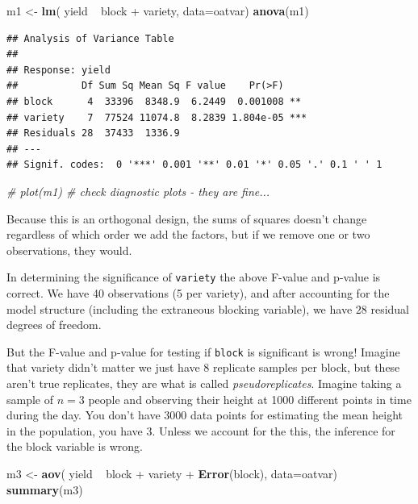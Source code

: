 \documentclass[]{book}
\newenvironment{Shaded}{\begin{snugshade}}{\end{snugshade}}
\newcommand{\KeywordTok}[1]{\textcolor[rgb]{0.13,0.29,0.53}{\textbf{{#1}}}}
\newcommand{\DataTypeTok}[1]{\textcolor[rgb]{0.13,0.29,0.53}{{#1}}}
\newcommand{\StringTok}[1]{\textcolor[rgb]{0.31,0.60,0.02}{{#1}}}
\newcommand{\CommentTok}[1]{\textcolor[rgb]{0.56,0.35,0.01}{\textit{{#1}}}}
\newcommand{\NormalTok}[1]{{#1}}
\theoremstyle{definition}
\theoremstyle{definition}
\theoremstyle{remark}
\begin{document}
\begin{Shaded}
\begin{Highlighting}[]
\NormalTok{m1 <-}\StringTok{ }\KeywordTok{lm}\NormalTok{( yield ~}\StringTok{ }\NormalTok{block +}\StringTok{ }\NormalTok{variety, }\DataTypeTok{data=}\NormalTok{oatvar)}
\KeywordTok{anova}\NormalTok{(m1)}
\end{Highlighting}
\end{Shaded}

\begin{verbatim}
## Analysis of Variance Table
## 
## Response: yield
##           Df Sum Sq Mean Sq F value    Pr(>F)    
## block      4  33396  8348.9  6.2449  0.001008 ** 
## variety    7  77524 11074.8  8.2839 1.804e-05 ***
## Residuals 28  37433  1336.9                      
## ---
## Signif. codes:  0 '***' 0.001 '**' 0.01 '*' 0.05 '.' 0.1 ' ' 1
\end{verbatim}

\begin{Shaded}
\begin{Highlighting}[]
\CommentTok{# plot(m1)      # check diagnostic plots - they are fine...}
\end{Highlighting}
\end{Shaded}

Because this is an orthogonal design, the sums of squares doesn't change
regardless of which order we add the factors, but if we remove one or
two observations, they would.

In determining the significance of \texttt{variety} the above F-value
and p-value is correct. We have 40 observations (5 per variety), and
after accounting for the model structure (including the extraneous
blocking variable), we have \(28\) residual degrees of freedom.

But the F-value and p-value for testing if \texttt{block} is significant
is wrong! Imagine that variety didn't matter we just have 8 replicate
samples per block, but these aren't true replicates, they are what is
called \emph{pseudoreplicates}. Imagine taking a sample of \(n=3\)
people and observing their height at 1000 different points in time
during the day. You don't have 3000 data points for estimating the mean
height in the population, you have 3. Unless we account for the this,
the inference for the block variable is wrong.

\begin{Shaded}
\begin{Highlighting}[]
\NormalTok{m3 <-}\StringTok{ }\KeywordTok{aov}\NormalTok{( yield ~}\StringTok{ }\NormalTok{block +}\StringTok{ }\NormalTok{variety +}\StringTok{ }\KeywordTok{Error}\NormalTok{(block), }\DataTypeTok{data=}\NormalTok{oatvar)}
\KeywordTok{summary}\NormalTok{(m3)}
\end{Highlighting}
\end{Shaded}
\end{document}
